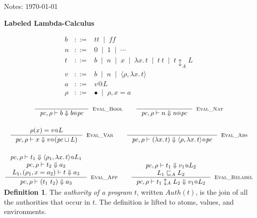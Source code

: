 \documentclass{article}
\makeatletter
\newcommand{\at}{\ensuremath{{\scriptstyle{@}}}}
\newcommand{\pc}{\ensuremath{{\mathit{pc}}}}
\theoremstyle{definition}
\newtheorem{definition}[theorem]{Definition}
\makeatother
\begin{document}
\begin{flushright}
  Notes: \today
\end{flushright}

\begin{flushleft}
  \textbf{Labeled Lambda-Calculus} 
\end{flushleft}

\[
\begin{array}{lcl}
  b & ::= &
  \mathit{tt}\;\; |\;\;
  \mathit{ff}
  \\
  n & ::= &
  0\;\; |\;\;
  1\;\; |\;\;
  \cdots
  \\
  t & ::= &
  b\;\; |\;\;
  n\;\; |\;\;
  x\;\; |\;\;
  \lambda{x}.\, t\;\; |\;\;
  t\ t\;\; |\;\;
  t \updownarrow_{A} L
  \\
  v & ::= &
  b\;\; |\;\;
  n\;\; |\;\;
  \langle{\rho, \lambda{x}.\, t\rangle}
  \\
  a & ::= &
  v \at L
  \\
  \rho & ::= &
  \bullet\;\; |\;\;
  \rho, x = a
\end{array}
\]

\begin{gather*}
  \inference{}{
    \pc, \rho |- b \Downarrow b \at \pc
  }[\textsc{Eval\_Bool}]
  \qquad
  \inference{}{
    \pc, \rho |- n \Downarrow n \at \pc
  }[\textsc{Eval\_Nat}]
  \\[3ex]
  \inference{
    \rho(x) = v \at L
  }{
    \pc, \rho |- x \Downarrow v \at (\pc \sqcup L)
  }[\textsc{Eval\_Var}]
  \qquad
  \inference{}{
    \pc, \rho |- (\lambda{x}.\, t) \Downarrow
    \langle{\rho, \lambda{x}.\, t\rangle} \at \pc
  }[\textsc{Eval\_Abs}]
  \\[3ex]
  \inference{
    \pc, \rho |- t_1 \Downarrow \langle{\rho_1, \lambda{x}.\, t\rangle} \at L_1
    \\
    \pc, \rho |- t_2 \Downarrow a_2
    \\
    L_1, (\rho_1, x = a_2) |- t \Downarrow a_3
  }{
    \pc, \rho |- (t_1\ t_2) \Downarrow a_3
  }[\textsc{Eval\_App}]
  \qquad
  \inference{
    \pc, \rho |- t_1 \Downarrow v_1 \at L_2
    \\
    L_1 \sqsubseteq_{A} L_2
  }{
    \pc, \rho |- t_1 \updownarrow_{A} L_2 \Downarrow v_1 \at L_2
  }[\textsc{Eval\_Relabel}]
  \\[-2ex]
\end{gather*}

\begin{definition}
  The \emph{authority of a program} $t$, written $\mathit{Auth}(t)$, is the
  join of all the authorities that occur in $t$. The definition is lifted to
  atoms, values, and environments.
\end{definition}
\end{document}
